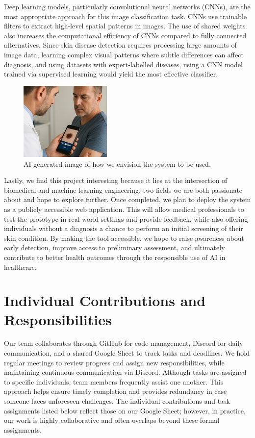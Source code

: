 \documentclass{article} %
\begin{document}
Deep learning models, particularly convolutional neural networks (CNNs), are the most appropriate approach for this image classification task. CNNs use trainable filters to extract high-level spatial patterns in images. The use of shared weights also increases the computational efficiency of CNNs compared to fully connected alternatives. Since skin disease detection requires processing large amounts of image data, learning complex visual patterns where subtle differences can affect diagnosis, and using datasets with expert-labelled diseases, using a CNN model trained via supervised learning would yield the most effective classifier.

\begin{figure}[h]
\begin{center}
\includegraphics[width=0.4\textwidth]{Figs/system_usage_concept.png}
\end{center}
\caption{AI-generated image of how we envision the system to be used.}
\end{figure}

Lastly, we find this project interesting because it lies at the intersection of biomedical and machine learning engineering, two fields we are both passionate about and hope to explore further. Once completed, we plan to deploy the system as a publicly accessible web application. This will allow medical professionals to test the prototype in real-world settings and provide feedback, while also offering individuals without a diagnosis a chance to perform an initial screening of their skin condition. By making the tool accessible, we hope to raise awareness about early detection, improve access to preliminary assessment, and ultimately contribute to better health outcomes through the responsible use of AI in healthcare.

\section{Individual Contributions and Responsibilities}

Our team collaborates through GitHub for code management, Discord for daily communication, and a shared Google Sheet to track tasks and deadlines. We hold regular meetings to review progress and assign new responsibilities, while maintaining continuous communication via Discord. Although tasks are assigned to specific individuals, team members frequently assist one another. This approach helps ensure timely completion and provides redundancy in case someone faces unforeseen challenges. The individual contributions and task assignments listed below reflect those on our Google Sheet; however, in practice, our work is highly collaborative and often overlaps beyond these formal assignments.
\end{document}
